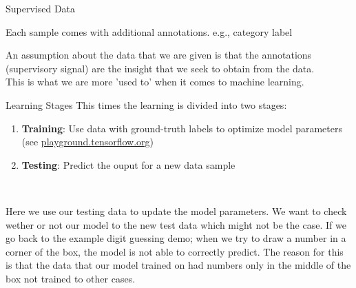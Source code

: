 \begin{parag}{Supervised Data}
    \begin{definition}
    Each sample comes with additional annotations. e.g., category label
    \end{definition}
	An assumption about the data that we are given is that the annotations (supervisory signal) are the insight that we seek to obtain from the data.\\
	This is what we are more 'used to' when it comes to machine learning. 

\end{parag}
\begin{parag}{Learning Stages}
	This times the learning is divided into two stages:
	\begin{enumerate}
		\item \textbf{Training}: Use data with ground-truth labels to optimize model parameters (see \href{http://playground.tensorflow.org}{playground.tensorflow.org})
		\item \textbf{Testing}: Predict the ouput for a new data sample
	\end{enumerate}
	
\end{parag}
\begin{center}
\end{center}
\begin{parag}{ $ $}

Here we  use our testing data to update the model parameters. We want to check wether or not our model  to the new test data which might not be the case. If we go back to the example digit guessing demo; when we try to draw a number in a corner of the box, the model is not able to correctly predict. The reason for this is that the data that our model trained on had numbers only in the middle of the box \textrightarrow not trained to other cases.
	
    
\end{parag}
